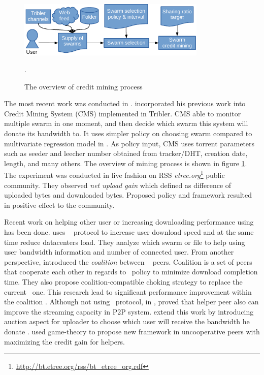 \begin{figure}[h]
	\centering
	\includegraphics[width=0.8\textwidth]{pics/creditmining2015.pdf}
	\caption{The overview of credit mining process \cite{2015:creditmining:capota}}.
	\label{fig:cm15}
\end{figure}

The most recent work was conducted in \citeyear{2015:creditmining:capota}\cite{2015:creditmining:capota}. \citeauthor{2015:creditmining:capota} incorporated his previous work into Credit Mining System (CMS) implemented in Tribler. CMS able to monitor multiple swarm in one moment, and then decide which swarm this system will donate its bandwidth to. It uses simpler policy on choosing swarm compared to multivariate regression model in \cite{2013:investmentcm:capota}. As policy input, CMS uses torrent parameters such as seeder and leecher number obtained from tracker/DHT, creation date, length, and many others. The overview of mining process is shown in figure \ref{fig:cm15}. The experiment was conducted in live fashion on RSS \textit{etree.org}\footnote{\url{http://bt.etree.org/rss/bt\_etree\_org.rdf}} public community. They observed \textit{net upload gain} which defined as difference of uploaded bytes and downloaded bytes. Proposed policy and framework resulted in positive effect to the community.

Recent work on helping other user or increasing downloading performance using \bt~ has been done. \citeauthor{2014:cloudseed:leon} uses \bt~ protocol to increase user download speed and at the same time reduce datacenters load. They analyze which swarm or file to help using user bandwidth information and number of connected user\cite{2014:cloudseed:leon}. From another perspective, \citeauthor{2015:coalitionbt:zhang} introduced the \textit{coalition} between \bt~ peers. Coalition is a set of peers that cooperate each other in regards to \bt~policy to minimize download completion time. They also propose coalition-compatible choking strategy to replace the current \bt~one. This research lead to significant performance improvement within the coalition \cite{2015:coalitionbt:zhang}. Although not using \bt~protocol, in \citeyear{2009:p2phelp:he}, \citeauthor{2009:p2phelp:he} proved that helper peer also can improve the streaming capacity in P2P system\cite{2009:p2phelp:he}. \citeauthor{2016:gameauctionp2pstream:mostafavi} extend this work by introducing auction aspect for uploader to choose which user will receive the bandwidth he donate \cite{2016:gameauctionp2pstream:mostafavi}. \citeauthor{2016:gameauctionp2pstream:mostafavi} used game-theory to propose new framework in uncooperative peers with maximizing the credit gain for helpers.



